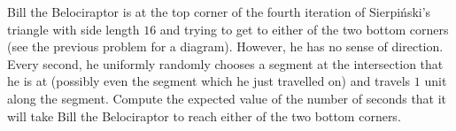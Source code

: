 Bill the Belociraptor is at the top corner of the fourth iteration of Sierpi\'nski's triangle with side length $16$ and trying to get to either of the two bottom corners (see the previous problem for a diagram). However, he has no sense of direction. Every second, he uniformly randomly chooses a segment at the intersection that he is at (possibly even the segment which he just travelled on) and travels $1$ unit along the segment. Compute the expected value of the number of seconds that it will take Bill the Belociraptor to reach either of the two bottom corners.
